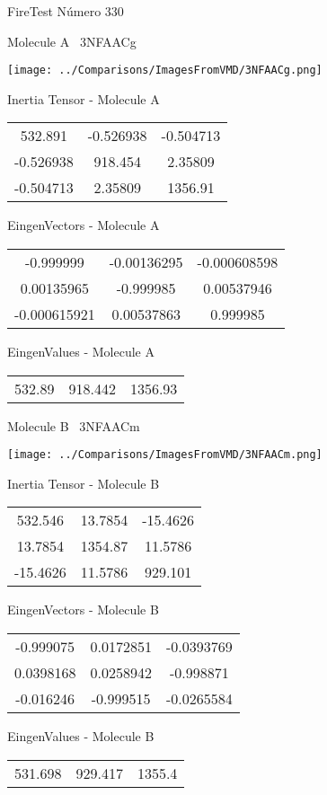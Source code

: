 \vtab[-3cm]
\begin{center}
{\large FireTest \tab Número 330}
\end{center}
\begin{multicols}{2}
\begin{center}

Molecule A \
3NFAACg

\texttt{[image: ../Comparisons/ImagesFromVMD/3NFAACg.png]}

Inertia Tensor - Molecule A \\
\begin{tabular}{|c c c|}
532.891	 & 	-0.526938	 & 	-0.504713	 \\
-0.526938	 & 	918.454	 & 	2.35809	 \\
-0.504713	 & 	2.35809	 & 	1356.91
\end{tabular}

\vtab
 EingenVectors - Molecule A     \\
\begin{tabular}{|c c c|}
-0.999999	 & 	-0.00136295	 & 	-0.000608598	 \\
0.00135965	 & 	-0.999985	 & 	0.00537946	 \\
-0.000615921	 & 	0.00537863	 & 	0.999985
\end{tabular}

\vtab
 EingenValues - Molecule A     \\
\begin{tabular}{|c c c|}
532.89	 & 	918.442	 & 	1356.93	 \\
\end{tabular}
\columnbreak

Molecule B \
3NFAACm

\texttt{[image: ../Comparisons/ImagesFromVMD/3NFAACm.png]}

Inertia Tensor - Molecule B \\
\begin{tabular}{|c c c|}
532.546	 & 	13.7854	 & 	-15.4626	 \\
13.7854	 & 	1354.87	 & 	11.5786	 \\
-15.4626	 & 	11.5786	 & 	929.101
\end{tabular}

\vtab
 EingenVectors - Molecule B     \\
\begin{tabular}{|c c c|}
-0.999075	 & 	0.0172851	 & 	-0.0393769	 \\
0.0398168	 & 	0.0258942	 & 	-0.998871	 \\
-0.016246	 & 	-0.999515	 & 	-0.0265584
\end{tabular}

\vtab
 EingenValues - Molecule B     \\
\begin{tabular}{|c c c|}
531.698	 & 	929.417	 & 	1355.4	 \\
\end{tabular}

\end{center}
\end{multicols}

